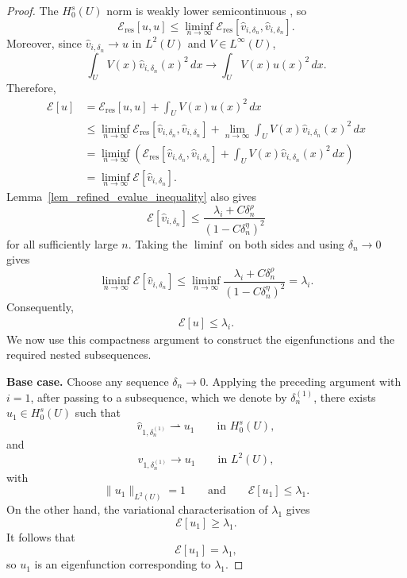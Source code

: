 \documentclass[preprint,12pt]{elsarticle}
\begin{document}
{\begin{proof}
The $H_0^s(U)$ norm is weakly lower semicontinuous
\cite[Sec.~4.8, Prob.~4]{Krey}, so
\[
    \mathcal E_{\mathrm{res}}[u,u]
    \leq
    \liminf_{n\to\infty}
    \mathcal E_{\mathrm{res}}
    [\hat v_{i,\delta_n},\hat v_{i,\delta_n}].
\]
Moreover, since $\hat v_{i,\delta_n}\to u$ in $L^2(U)$ and
$V\in L^\infty(U)$,
\[
    \int_U V(x)\hat v_{i,\delta_n}(x)^2\,dx
    \longrightarrow
    \int_U V(x)u(x)^2\,dx.
\]
Therefore,
\begin{align*}
    \mathcal E[u]
    &=
    \mathcal E_{\mathrm{res}}[u,u]
    +
    \int_U V(x)u(x)^2\,dx\\
    &\leq
    \liminf_{n\to\infty}
    \mathcal E_{\mathrm{res}}
    [\hat v_{i,\delta_n},\hat v_{i,\delta_n}]
    +
    \lim_{n\to\infty}
    \int_U V(x)\hat v_{i,\delta_n}(x)^2\,dx\\
    &=
    \liminf_{n\to\infty}
    \left(
        \mathcal E_{\mathrm{res}}
        [\hat v_{i,\delta_n},\hat v_{i,\delta_n}]
        +
        \int_U V(x)\hat v_{i,\delta_n}(x)^2\,dx
    \right)\\
    &=
    \liminf_{n\to\infty}
    \mathcal E[\hat v_{i,\delta_n}].
\end{align*}
Lemma~\ref{lem_refined_evalue_inequality} also gives
\[
    \mathcal E[\hat v_{i,\delta_n}]
    \leq
    \frac{\lambda_i+C\delta_n^\rho}
         {(1-C\delta_n^\eta)^2}
\]
for all sufficiently large $n$. Taking the $\liminf$ on both sides
and using $\delta_n\to0$ gives
\[
    \liminf_{n\to\infty}
    \mathcal E[\hat v_{i,\delta_n}]
    \leq
    \liminf_{n\to\infty}
    \frac{\lambda_i+C\delta_n^\rho}
         {(1-C\delta_n^\eta)^2}
    =
    \lambda_i.
\]
Consequently,
\begin{align}\label{energy_bound_subseq_limit}
    \mathcal E[u]\leq\lambda_i.
\end{align}
We now use this compactness argument to construct the eigenfunctions
and the required nested subsequences.

\textbf{Base case.}
Choose any sequence $\delta_n\to0$. Applying the preceding argument
with $i=1$, after passing to a subsequence, which we denote by
$\delta_n^{(1)}$, there exists $u_1\in H_0^s(U)$ such that
\[
    \hat v_{1,\delta_n^{(1)}}
    \rightharpoonup u_1
    \qquad\text{in }H_0^s(U),
\]
and
\[
    \hat v_{1,\delta_n^{(1)}}
    \longrightarrow u_1
    \qquad\text{in }L^2(U),
\]
with
\[
    \|u_1\|_{L^2(U)}=1
    \qquad\text{and}\qquad
    \mathcal E[u_1]\leq\lambda_1.
\]
On the other hand, the variational characterisation of $\lambda_1$
gives
\[
    \mathcal E[u_1]\geq\lambda_1.
\]
It follows that
\[
    \mathcal E[u_1]=\lambda_1,
\]
so $u_1$ is an eigenfunction corresponding to $\lambda_1$.


\end{proof}}
\end{document}
